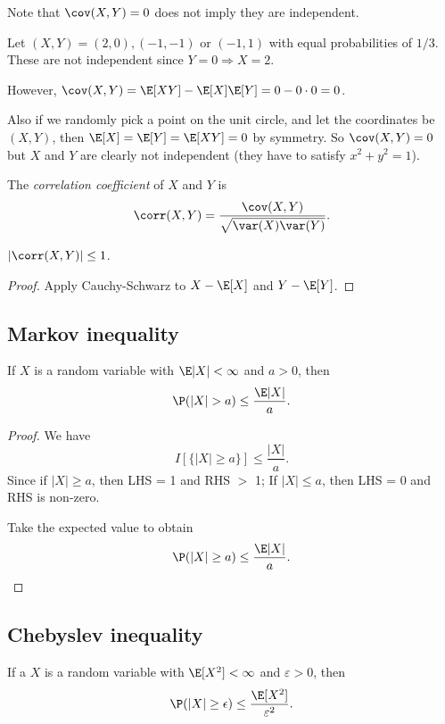 \documentclass[a4paper]{article}
\begin{document}
Note that $\cov(X, Y) = 0$ does not imply they are independent.
\begin{eg}
  Let $(X, Y) = (2, 0), (-1, -1)$ or $(-1, 1)$ with equal probabilities of $1/3$. These are not independent since $Y = 0\Rightarrow X = 2$.

  However, $\cov (X, Y) = \E[XY] - \E[X]\E[Y] = 0 - 0\cdot 0 = 0$.

  Also if we randomly pick a point on the unit circle, and let the coordinates be $(X, Y)$, then $\E[X] = \E[Y] = \E[XY] = 0$ by symmetry. So $\cov(X, Y) = 0$ but $X$ and $Y$ are clearly not independent (they have to satisfy $x^2 + y^2 = 1$).
\end{eg}

\begin{defi}
  The \emph{correlation coefficient} of $X$ and $Y$ is
  \[
    \corr(X, Y) = \frac{\cov (X, Y)}{\sqrt{\var (X)\var (Y)}}.
  \]
\end{defi}
\begin{cor}
  $|\corr(X, Y)| \leq 1$.
\end{cor}

\begin{proof}
  Apply Cauchy-Schwarz to $X - \E[X]$ and $Y - \E[Y]$.
\end{proof}

\subsection{Markov inequality}
\begin{thm}
  If $X$ is a random variable with $\E|X| < \infty$ and $ a> 0$, then
  \[
    \P(|X| > a) \leq \frac{\E|X|}{a}.
  \]
\end{thm}

\begin{proof}
  We have
  \[
    I[\{|X|\geq a\}] \leq \frac{|X|}{a}.
  \]
  Since if $|X| \geq a$, then LHS = 1 and RHS $>$ 1; If $|X| \leq a$, then LHS = 0 and RHS is non-zero.
  
  Take the expected value to obtain
  \[
    \P(|X| \geq a) \leq \frac{\E |X|}{a}.
  \]
\end{proof}

\subsection{Chebyslev inequality}
\begin{thm}
  If a $X$ is a random variable with $\E[X^2] < \infty$ and $\varepsilon > 0$, then
  \[
    \P(|X| \geq \epsilon) \leq \frac{\E[X^2]}{\varepsilon^2}.
  \]
\end{thm}
\end{document}
